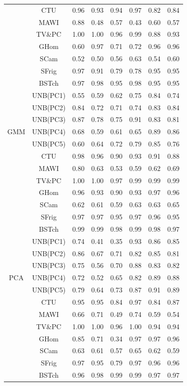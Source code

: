 \documentclass{article}
\begin{document}
\begin{longtable}[c]{|c|c|c|c|c|c|c|c|}
\cmidrule{2-8}
&CTU & 0.96 & 0.93 & 0.94 & 0.97 & 0.82 & 0.84\\ 
\cmidrule{2-8}
&MAWI & 0.88 & 0.48 & 0.57 & 0.43 & 0.60 & 0.57\\ 
\cmidrule{2-8}
&TV\&PC & 1.00 & 1.00 & 0.96 & 0.99 & 0.88 & 0.93\\ 
\cmidrule{2-8}
&GHom & 0.60 & 0.97 & 0.71 & 0.72 & 0.96 & 0.96\\ 
&SCam & 0.52 & 0.50 & 0.56 & 0.63 & 0.54 & 0.60\\ 
&SFrig & 0.97 & 0.91 & 0.79 & 0.78 & 0.95 & 0.95 \\ 
&BSTch & 0.97 & 0.98 & 0.95 & 0.98 & 0.95 & 0.95  \\ 
\midrule
\multirow{7}{*}{GMM} &UNB(PC1) & 0.55 & 0.59 & 0.62 & 0.75 & 0.84 & 0.74  \\ 
&UNB(PC2) & 0.84 & 0.72 & 0.71 & 0.74 & 0.83 & 0.84  \\ 
&UNB(PC3) & 0.87 & 0.78 & 0.75 & 0.91 & 0.83 & 0.81 \\ 
&UNB(PC4) & 0.68 & 0.59 & 0.61 & 0.65 & 0.89 & 0.86 \\ 
&UNB(PC5) & 0.60 & 0.64 & 0.72 & 0.79 & 0.85 & 0.76 \\ 
\cmidrule{2-8}
&CTU & 0.98 & 0.96 & 0.90 & 0.93 & 0.91 & 0.88\\ 
\cmidrule{2-8}
&MAWI & 0.80 & 0.63 & 0.53 & 0.59 & 0.62 & 0.69\\ 
\cmidrule{2-8}
&TV\&PC & 1.00 & 1.00 & 0.97 & 0.99 & 0.99 & 0.99\\ 
\cmidrule{2-8}
&GHom & 0.96 & 0.93 & 0.90 & 0.93 & 0.97 & 0.96\\ 
&SCam & 0.62 & 0.61 & 0.59 & 0.63 & 0.63 & 0.65\\ 
&SFrig & 0.97 & 0.97 & 0.95 & 0.97 & 0.96 & 0.95 \\ 
&BSTch & 0.99 & 0.99 & 0.98 & 0.99 & 0.98 & 0.97  \\ 
\midrule
\multirow{7}{*}{PCA} &UNB(PC1) & 0.74 & 0.41 & 0.35 & 0.93 & 0.86 & 0.85  \\ 
&UNB(PC2) & 0.86 & 0.67 & 0.71 & 0.82 & 0.85 & 0.81  \\ 
&UNB(PC3) & 0.75 & 0.56 & 0.70 & 0.88 & 0.83 & 0.82 \\ 
&UNB(PC4) & 0.72 & 0.52 & 0.65 & 0.82 & 0.89 & 0.88 \\ 
&UNB(PC5) & 0.79 & 0.64 & 0.73 & 0.87 & 0.91 & 0.89 \\ 
\cmidrule{2-8}
&CTU & 0.95 & 0.95 & 0.84 & 0.97 & 0.84 & 0.87\\ 
\cmidrule{2-8}
&MAWI & 0.66 & 0.71 & 0.49 & 0.74 & 0.59 & 0.54\\ 
\cmidrule{2-8}
&TV\&PC & 1.00 & 1.00 & 0.96 & 1.00 & 0.94 & 0.94\\ 
\cmidrule{2-8}
&GHom & 0.85 & 0.71 & 0.34 & 0.97 & 0.97 & 0.96\\ 
&SCam & 0.63 & 0.61 & 0.57 & 0.65 & 0.62 & 0.59\\ 
&SFrig & 0.97 & 0.95 & 0.79 & 0.97 & 0.96 & 0.96 \\ 
&BSTch & 0.96 & 0.98 & 0.99 & 0.99 & 0.97 & 0.97  \\ 
\bottomrule
\end{longtable}
\end{document}
